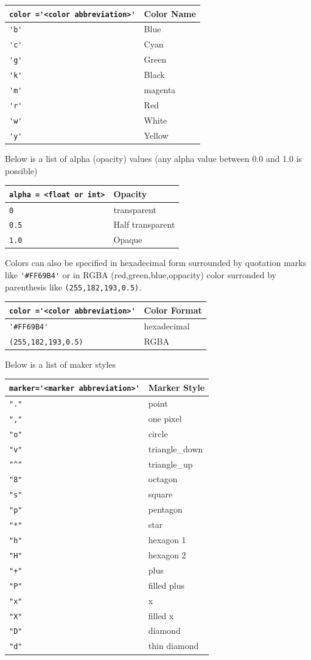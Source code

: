 \documentclass{book}
\begin{document}
\begin{longtable}[]{@{}ll@{}}
\toprule
\lstinline!color ='<color abbreviation>'! & Color Name\tabularnewline
\midrule
\endhead
\lstinline!'b'! & Blue\tabularnewline
\lstinline!'c'! & Cyan\tabularnewline
\lstinline!'g'! & Green\tabularnewline
\lstinline!'k'! & Black\tabularnewline
\lstinline!'m'! & magenta\tabularnewline
\lstinline!'r'! & Red\tabularnewline
\lstinline!'w'! & White\tabularnewline
\lstinline!'y'! & Yellow\tabularnewline
\bottomrule
\end{longtable}

Below is a list of alpha (opacity) values (any alpha value between 0.0
and 1.0 is possible)

\begin{longtable}[]{@{}ll@{}}
\toprule
\lstinline!alpha = <float or int>! & Opacity\tabularnewline
\midrule
\endhead
\lstinline!0! & transparent\tabularnewline
\lstinline!0.5! & Half transparent\tabularnewline
\lstinline!1.0! & Opaque\tabularnewline
\bottomrule
\end{longtable}

Colors can also be specified in hexadecimal form surrounded by quotation
marks like \lstinline!'#FF69B4'! or in RGBA (red,green,blue,oppacity)
color surronded by parenthesis like \lstinline!(255,182,193,0.5)!.

\begin{longtable}[]{@{}ll@{}}
\toprule
\lstinline!color ='<color abbreviation>'! & Color Format\tabularnewline
\midrule
\endhead
\lstinline!'#FF69B4'! & hexadecimal\tabularnewline
\lstinline!(255,182,193,0.5)! & RGBA\tabularnewline
\bottomrule
\end{longtable}

Below is a list of maker styles

\begin{longtable}[]{@{}ll@{}}
\toprule
\lstinline!marker='<marker abbreviation>'! & Marker Style\tabularnewline
\midrule
\endhead
\lstinline!"."! & point\tabularnewline
\lstinline!","! & one pixel\tabularnewline
\lstinline!"o"! & circle\tabularnewline
\lstinline!"v"! & triangle\_down\tabularnewline
\lstinline!"^"! & triangle\_up\tabularnewline
\lstinline!"8"! & octagon\tabularnewline
\lstinline!"s"! & square\tabularnewline
\lstinline!"p"! & pentagon\tabularnewline
\lstinline!"*"! & star\tabularnewline
\lstinline!"h"! & hexagon 1\tabularnewline
\lstinline!"H"! & hexagon 2\tabularnewline
\lstinline!"+"! & plus\tabularnewline
\lstinline!"P"! & filled plus\tabularnewline
\lstinline!"x"! & x\tabularnewline
\lstinline!"X"! & filled x\tabularnewline
\lstinline!"D"! & diamond\tabularnewline
\lstinline!"d"! & thin diamond\tabularnewline
\bottomrule
\end{longtable}
\end{document}
